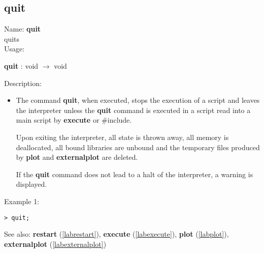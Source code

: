 \subsection{quit}
\label{labquit}
\noindent Name: \textbf{quit}\\
quits \sollya\\
\noindent Usage: 
\begin{center}
\textbf{quit} : \textsf{void} $\rightarrow$ \textsf{void}
\\ 
\end{center}
\noindent Description: \begin{itemize}

\item The command \textbf{quit}, when executed, stops the execution of a \sollya
   script and leaves the \sollya interpreter unless the \textbf{quit} command 
   is executed in a \sollya script read into a main \sollya script by
   \textbf{execute} or $\#$include.
    
   Upon exiting the \sollya interpreter, all state is thrown away, all
   memory is deallocated, all bound libraries are unbound and the
   temporary files produced by \textbf{plot} and \textbf{externalplot} are deleted.
    
   If the \textbf{quit} command does not lead to a halt of the \sollya
   interpreter, a warning is displayed.
\end{itemize}
\noindent Example 1: 
\begin{center}\begin{minipage}{15cm}\begin{Verbatim}[frame=single]
> quit;
\end{Verbatim}
\end{minipage}\end{center}
See also: \textbf{restart} (\ref{labrestart}), \textbf{execute} (\ref{labexecute}), \textbf{plot} (\ref{labplot}), \textbf{externalplot} (\ref{labexternalplot})
